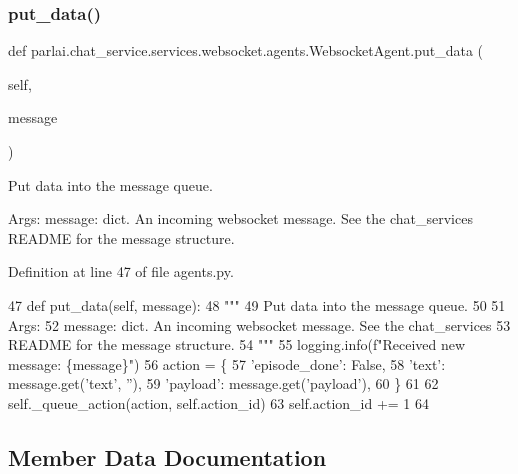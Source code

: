 \subsubsection{\texorpdfstring{put\+\_\+data()}{put\_data()}}
{\footnotesize\ttfamily def parlai.\+chat\+\_\+service.\+services.\+websocket.\+agents.\+Websocket\+Agent.\+put\+\_\+data (\begin{DoxyParamCaption}\item[{}]{self,  }\item[{}]{message }\end{DoxyParamCaption})}

\begin{DoxyVerb}Put data into the message queue.

Args:
    message: dict. An incoming websocket message. See the chat_services
README for the message structure.
\end{DoxyVerb}
 

Definition at line 47 of file agents.\+py.


\begin{DoxyCode}
47     \textcolor{keyword}{def }put\_data(self, message):
48         \textcolor{stringliteral}{"""}
49 \textcolor{stringliteral}{        Put data into the message queue.}
50 \textcolor{stringliteral}{}
51 \textcolor{stringliteral}{        Args:}
52 \textcolor{stringliteral}{            message: dict. An incoming websocket message. See the chat\_services}
53 \textcolor{stringliteral}{                README for the message structure.}
54 \textcolor{stringliteral}{        """}
55         logging.info(f\textcolor{stringliteral}{"Received new message: \{message\}"})
56         action = \{
57             \textcolor{stringliteral}{'episode\_done'}: \textcolor{keyword}{False},
58             \textcolor{stringliteral}{'text'}: message.get(\textcolor{stringliteral}{'text'}, \textcolor{stringliteral}{''}),
59             \textcolor{stringliteral}{'payload'}: message.get(\textcolor{stringliteral}{'payload'}),
60         \}
61 
62         self.\_queue\_action(action, self.action\_id)
63         self.action\_id += 1
64 \end{DoxyCode}


\subsection{Member Data Documentation}
\mbox{\label{classparlai_1_1chat__service_1_1services_1_1websocket_1_1agents_1_1WebsocketAgent_a013ba8209bd78bec4b657f422371d81e}} 
